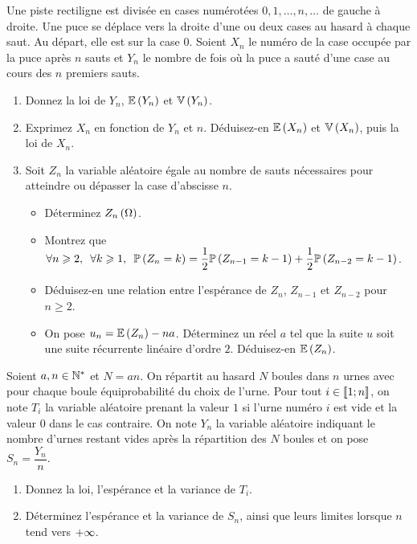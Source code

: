 \begin{exoss}
Une piste rectiligne est divisée en cases numérotées \(0,1,\dots,n,\dots\) de gauche à droite. Une puce se déplace vers la droite d'une ou deux cases au hasard à chaque saut. Au départ, elle est sur la case \(0\). Soient \(X_n\) le numéro de la case occupée par la puce après \(n\) sauts et \(Y_n\) le nombre de fois où la puce a sauté d'une case au cours des \(n\) premiers sauts.

\begin{enumerate}
    \item Donnez la loi de \(Y_n\), \(\operatorname{\mathbb{E}}\left(Y_n\right)\) et \(\operatorname{\mathbb{V}}\left(Y_n\right)\). \\
    \item Exprimez \(X_n\) en fonction de \(Y_n\) et \(n\). Déduisez-en \(\operatorname{\mathbb{E}}\left(X_n\right)\) et \(\operatorname{\mathbb{V}}\left(X_n\right)\), puis la loi de \(X_n\). \\
    \item Soit \(Z_n\) la variable aléatoire égale au nombre de sauts nécessaires pour atteindre ou dépasser la case d'abscisse \(n\). \\ \begin{itemize}
        \item Déterminez \(Z_n\left(\Omega\right)\). \\
        \item Montrez que \(\quantifs{\forall n\geq2;\forall k\geq1}\proba{Z_n=k}=\dfrac{1}{2}\proba{Z_{n-1}=k-1}+\dfrac{1}{2}\proba{Z_{n-2}=k-1}\). \\
        \item Déduisez-en une relation entre l'espérance de \(Z_n\), \(Z_{n-1}\) et \(Z_{n-2}\) pour \(n\geq2\). \\
        \item On pose \(u_n=\operatorname{\mathbb{E}}\left(Z_n\right)-na\). Déterminez un réel \(a\) tel que la suite \(u\) soit une suite récurrente linéaire d'ordre \(2\). Déduisez-en \(\operatorname{\mathbb{E}}\left(Z_n\right)\).
    \end{itemize}
\end{enumerate}
\end{exoss}

\begin{exoss}
Soient \(a,n\in\mathbb{N}^*\) et \(N=an\). On répartit au hasard \(N\) boules dans \(n\) urnes avec pour chaque boule équiprobabilité du choix de l'urne. Pour tout \(i\in\left\llbracket1;n\right\rrbracket\), on note \(T_i\) la variable aléatoire prenant la valeur \(1\) si l'urne numéro \(i\) est vide et la valeur \(0\) dans le cas contraire. On note \(Y_n\) la variable aléatoire indiquant le nombre d'urnes restant vides après la répartition des \(N\) boules et on pose \(S_n=\dfrac{Y_n}{n}\).

\begin{enumerate}
    \item Donnez la loi, l'espérance et la variance de \(T_i\). \\
    \item Déterminez l'espérance et la variance de \(S_n\), ainsi que leurs limites lorsque \(n\) tend vers \(+\infty\).
\end{enumerate}
\end{exoss}

